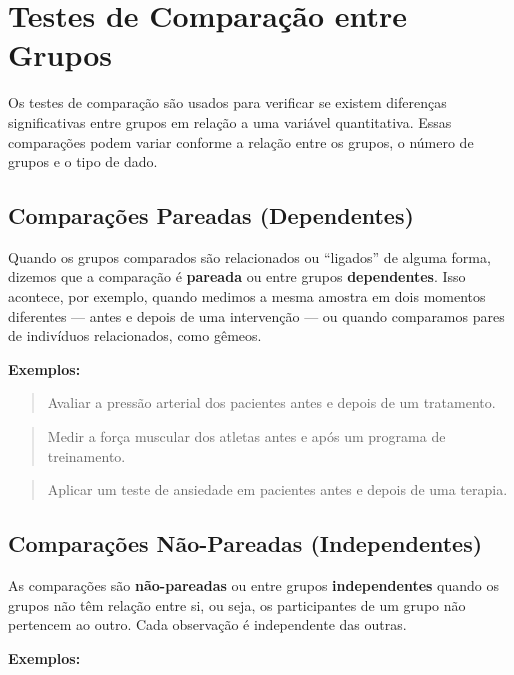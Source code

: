 \documentclass[
]{book}
\begin{document}
\chapter{Testes de Comparação entre Grupos}\label{testes-de-comparauxe7uxe3o-entre-grupos}

Os testes de comparação são usados para verificar se existem diferenças significativas entre grupos em relação a uma variável quantitativa. Essas comparações podem variar conforme a relação entre os grupos, o número de grupos e o tipo de dado.

\section{Comparações Pareadas (Dependentes)}\label{comparauxe7uxf5es-pareadas-dependentes}

Quando os grupos comparados são relacionados ou ``ligados'' de alguma forma, dizemos que a comparação é \textbf{pareada} ou entre grupos \textbf{dependentes}. Isso acontece, por exemplo, quando medimos a mesma amostra em dois momentos diferentes --- antes e depois de uma intervenção --- ou quando comparamos pares de indivíduos relacionados, como gêmeos.

\textbf{Exemplos:}

\begin{quote}
Avaliar a pressão arterial dos pacientes antes e depois de um tratamento.
\end{quote}

\begin{quote}
Medir a força muscular dos atletas antes e após um programa de treinamento.
\end{quote}

\begin{quote}
Aplicar um teste de ansiedade em pacientes antes e depois de uma terapia.
\end{quote}

\section{Comparações Não-Pareadas (Independentes)}\label{comparauxe7uxf5es-nuxe3o-pareadas-independentes}

As comparações são \textbf{não-pareadas} ou entre grupos \textbf{independentes} quando os grupos não têm relação entre si, ou seja, os participantes de um grupo não pertencem ao outro. Cada observação é independente das outras.

\textbf{Exemplos:}
\end{document}
